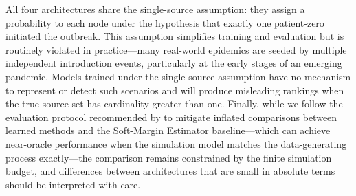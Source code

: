 All four architectures share the single-source assumption: they assign a
probability to each node under the hypothesis that exactly one patient-zero
initiated the outbreak. This assumption simplifies training and evaluation but
is routinely violated in practice---many real-world epidemics are seeded by
multiple independent introduction events, particularly at the early stages of
an emerging pandemic. Models trained under the single-source assumption have no
mechanism to represent or detect such scenarios and will produce misleading
rankings when the true source set has cardinality greater than one. Finally,
while we follow the evaluation protocol recommended by \cite{Sterchi2025} to
mitigate inflated comparisons between learned methods and the Soft-Margin
Estimator baseline---which can achieve near-oracle performance when the
simulation model matches the data-generating process exactly---the comparison
remains constrained by the finite simulation budget, and differences between
architectures that are small in absolute terms should be interpreted with care.
